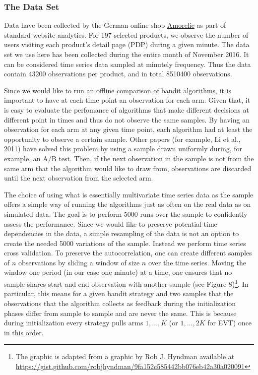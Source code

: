 \documentclass[11pt,]{article}
\let\rmarkdownfootnote\footnote%
\def\footnote{\protect\rmarkdownfootnote}
\begin{document}
\subsubsection{The Data Set}\label{the-data-set}

Data have been collected by the German online shop
\href{https://amorelie.de}{Amorelie} as part of standard website
analytics. For 197 selected products, we observe the number of users
visiting each product's detail page (PDP) during a given minute. The
data set we use here has been collected during the entire month of
November 2016. It can be considered time series data sampled at minutely
frequency. Thus the data contain 43200 observations per product, and in
total 8510400 observations.

Since we would like to run an offline comparison of bandit algorithms,
it is important to have at each time point an observation for each arm.
Given that, it is easy to evaluate the perfomance of algorithms that
make different decisions at different point in times and thus do not
observe the same samples. By having an observation for each arm at any
given time point, each algorithm had at least the opportunity to observe
a certain sample. Other papers (for example, Li et al., 2011) have
solved this problem by using a sample drawn uniformly during, for
example, an A/B test. Then, if the next observation in the sample is not
from the same arm that the algorithm would like to draw from,
observations are discarded until the next observation from the selected
arm.

The choice of using what is essentially multivariate time series data as
the sample offers a simple way of running the algorithms just as often
on the real data as on simulated data. The goal is to perform 5000 runs
over the sample to confidently assess the performance. Since we would
like to preserve potential time dependencies in the data, a simple
resampling of the data is not an option to create the needed 5000
variations of the sample. Instead we perform time series cross
validation. To preserve the autocorrelation, one can create different
samples of \(n\) observations by sliding a window of size \(n\) over the
time series. Moving the window one period (in our case one minute) at a
time, one ensures that no sample shares start and end observation with
another sample (see Figure 8)\footnote{The graphic is adapted from a
  graphic by Rob J. Hyndman available at
  \url{https://gist.github.com/robjhyndman/9fa152c585442bb076eb42a30a020091}}.
In particular, this means for a given bandit strategy and two samples
that the observations that the algorithm collects as feedback during the
initialization phases differ from sample to sample and are never the
same. This is because during initialization every strategy pulls arms
\(1, ..., K\) (or \(1,...,2K\) for EVT) once in this order.
\end{document}

